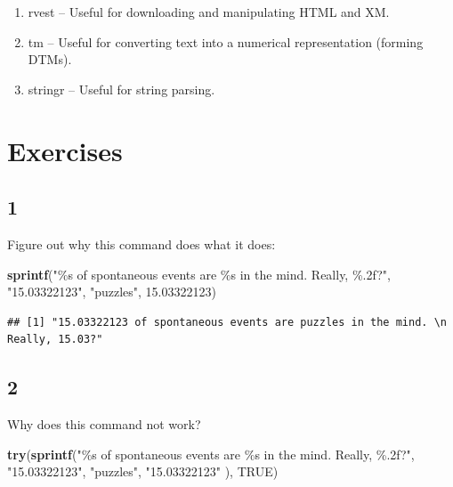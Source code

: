 \documentclass[
]{book}
\newenvironment{Shaded}{\begin{snugshade}}{\end{snugshade}}
\newcommand{\FloatTok}[1]{\textcolor[rgb]{0.00,0.00,0.81}{#1}}
\newcommand{\KeywordTok}[1]{\textcolor[rgb]{0.13,0.29,0.53}{\textbf{#1}}}
\newcommand{\NormalTok}[1]{#1}
\newcommand{\OtherTok}[1]{\textcolor[rgb]{0.56,0.35,0.01}{#1}}
\newcommand{\StringTok}[1]{\textcolor[rgb]{0.31,0.60,0.02}{#1}}
\providecommand{\tightlist}{%
  \setlength{\itemsep}{0pt}\setlength{\parskip}{0pt}}
\theoremstyle{definition}
\theoremstyle{definition}
\theoremstyle{definition}
\theoremstyle{remark}
\begin{document}
\begin{enumerate}
\def\labelenumi{\arabic{enumi}.}
\tightlist
\item
  rvest -- Useful for downloading and manipulating HTML and XM.
\item
  tm -- Useful for converting text into a numerical representation (forming DTMs).
\item
  stringr -- Useful for string parsing.
\end{enumerate}

\hypertarget{exercises-5}{%
\section*{Exercises}\label{exercises-5}}

\hypertarget{section-17}{%
\subsection*{1}\label{section-17}}

Figure out why this command does what it does:

\begin{Shaded}
\begin{Highlighting}[]
\KeywordTok{sprintf}\NormalTok{(}\StringTok{"\%s of spontaneous events are \%s in the mind. }
\StringTok{        Really, \%.2f?"}\NormalTok{, }
        \StringTok{"15.03322123"}\NormalTok{, }\StringTok{"puzzles"}\NormalTok{, }\FloatTok{15.03322123}\NormalTok{)}
\end{Highlighting}
\end{Shaded}

\begin{verbatim}
## [1] "15.03322123 of spontaneous events are puzzles in the mind. \n        Really, 15.03?"
\end{verbatim}

\hypertarget{section-18}{%
\subsection*{2}\label{section-18}}

Why does this command not work?

\begin{Shaded}
\begin{Highlighting}[]
\KeywordTok{try}\NormalTok{(}\KeywordTok{sprintf}\NormalTok{(}\StringTok{"\%s of spontaneous events are \%s in the mind. Really, \%.2f?"}\NormalTok{,}
            \StringTok{"15.03322123"}\NormalTok{, }\StringTok{"puzzles"}\NormalTok{, }\StringTok{"15.03322123"}\NormalTok{ ), }\OtherTok{TRUE}\NormalTok{)  }
\end{Highlighting}
\end{Shaded}
\end{document}
